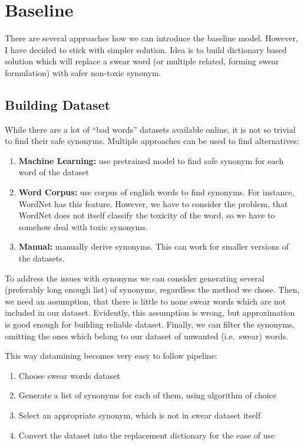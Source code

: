 \section{Baseline}

There are several approaches how we can introduce the baseline model. However,
I have decided to stick with simpler solution. Idea is to build dictionary
based solution which will replace a swear word (or multiple related, forming
swear formulation) with safer non-toxic synonym.

\subsection{Building Dataset}

While there are a lot of ``bad words'' datasets available online, it is not so
trivial to find their safe synonyms. Multiple approaches can be used to find
alternatives:

\begin{enumerate}
    \item \textbf{Machine Learning:} use pretrained model to find safe synonym for each word of the dataset
    \item \textbf{Word Corpus:} use corpus of english words to find synonyms. For instance, WordNet has this
          feature. However, we have to consider the problem, that WordNet does not itself
          classify the toxicity of the word, so we have to somehow deal with toxic
          synonyms.
    \item \textbf{Manual:} manually derive synonyms. This can work for smaller versions of the datasets.
\end{enumerate}

To address the issues with synonyms we can consider generating several
(preferably long enough list) of synonyms, regardless the method we chose.
Then, we need an assumption, that there is little to none swear words which are
not included in our dataset. Evidently, this assumption is wrong, but
approximation is good enough for building reliable dataset. Finally, we can
filter the synonyms, omitting the ones which belong to our dataset of unwanted
(i.e.~swear) words.

This way datamining becomes very easy to follow pipeline:
\begin{enumerate}
    \item Choose swear words dataset
    \item Generate a list of synonyms for each of them, using algorithm of choice
    \item Select an appropriate synonym, which is not in swear dataset itself
    \item Convert the dataset into the replacement dictionary for the ease of use
\end{enumerate}

